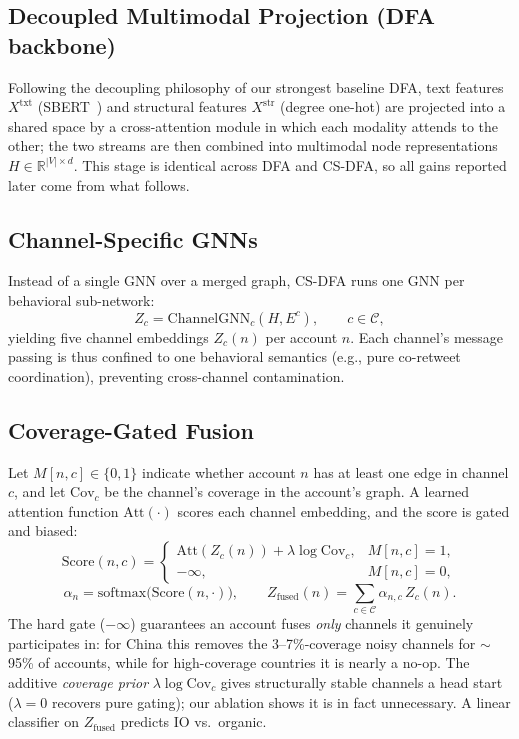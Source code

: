 \documentclass[conference]{IEEEtran}
\newcommand{\method}{CS-DFA}
\begin{document}
\subsection{Decoupled Multimodal Projection (DFA backbone)}
Following the decoupling philosophy of our strongest baseline DFA, text
features $X^{\text{txt}}$ (SBERT~\cite{reimers2019sbert}) and structural
features $X^{\text{str}}$ (degree one-hot) are projected into a shared space
by a cross-attention module in which each modality attends to the other; the
two streams are then combined into multimodal node representations
$H \in \mathbb{R}^{|V| \times d}$. This stage is identical across DFA and
\method{}, so all gains reported later come from what follows.

\subsection{Channel-Specific GNNs}
Instead of a single GNN over a merged graph, \method{} runs one GNN per
behavioral sub-network:
\begin{equation}
Z_c = \mathrm{ChannelGNN}_c(H, E^c), \qquad c \in \mathcal{C},
\end{equation}
yielding five channel embeddings $Z_c(n)$ per account $n$. Each channel's
message passing is thus confined to one behavioral semantics (e.g., pure
co-retweet coordination), preventing cross-channel contamination.

\subsection{Coverage-Gated Fusion}
Let $M[n,c] \in \{0,1\}$ indicate whether account $n$ has at least one edge
in channel $c$, and let $\mathrm{Cov}_c$ be the channel's coverage in the
account's graph. A learned attention function $\mathrm{Att}(\cdot)$ scores
each channel embedding, and the score is gated and biased:
\begin{equation}
\mathrm{Score}(n,c) =
\begin{cases}
\mathrm{Att}\!\left(Z_c(n)\right) + \lambda \log \mathrm{Cov}_c, & M[n,c]=1,\\[2pt]
-\infty, & M[n,c]=0,
\end{cases}
\label{eq:gate}
\end{equation}
\begin{equation}
\alpha_n = \mathrm{softmax}\!\big(\mathrm{Score}(n,\cdot)\big), \qquad
Z_{\text{fused}}(n) = \sum_{c \in \mathcal{C}} \alpha_{n,c}\, Z_c(n).
\end{equation}
The hard gate ($-\infty$) guarantees an account fuses \emph{only} channels
it genuinely participates in: for China this removes the 3--7\%-coverage
noisy channels for $\sim$95\% of accounts, while for high-coverage countries
it is nearly a no-op. The additive \emph{coverage prior}
$\lambda \log \mathrm{Cov}_c$ gives structurally stable channels a head
start ($\lambda{=}0$ recovers pure gating); our ablation shows it is in fact
unnecessary. A linear classifier on $Z_{\text{fused}}$ predicts IO vs.\
organic.
\end{document}
